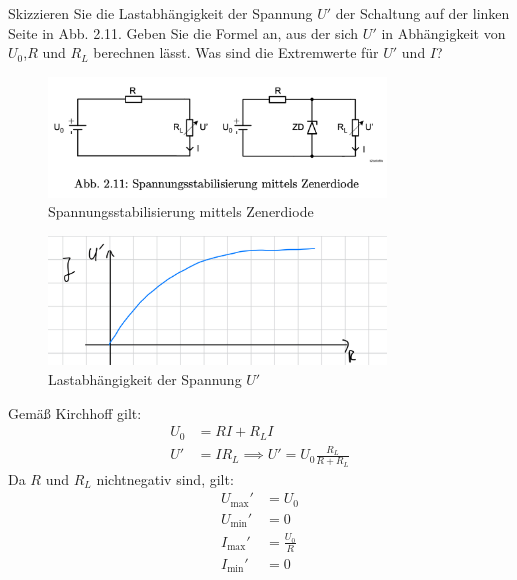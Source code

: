 \documentclass{article}
\theoremstyle{definition}
\begin{document}
\begin{voraufgabe}{Skizzieren Sie die Lastabhängigkeit der Spannung $U'$ der Schaltung auf der linken Seite in Abb. 2.11. Geben Sie die Formel an, aus der sich $U'$ in Abhängigkeit von $U_0$,$R$ und $R_L$ berechnen lässt. Was sind die Extremwerte für $U'$ und $I$?}
    \begin{figure}[H]
        \centering
        \includegraphics[width=0.8\textwidth]{figs/fig2_11.png}
        \caption{Spannungsstabilisierung mittels Zenerdiode\cite{anleitung}}
        \label{fig:Abb2.11}
    \end{figure}
    \begin{figure}[H]
        \centering
        \includegraphics[width=0.8\textwidth]{figs/fig2_J.png}
        \caption{Lastabhängigkeit der Spannung $U'$}
        \label{figJ}
    \end{figure}
    Gemäß Kirchhoff gilt:
    \begin{align*}
        U_0 &= R I + R_L I\\
        U' &= I R_L
        \implies U' = U_0 \frac{R_L}{R+R_L}
    \end{align*}
    Da $R$ und $R_L$ nichtnegativ sind, gilt:
    \begin{align*}
        U_\mathrm{\max{}}' &= U_0 \\
        U_\mathrm{\min{}}' &= 0 \\
        I_\mathrm{\max{}}' &= \frac{U_0}{R} \\
        I_\mathrm{\min{}}' &= 0
    \end{align*}

\end{voraufgabe}
\end{document}
